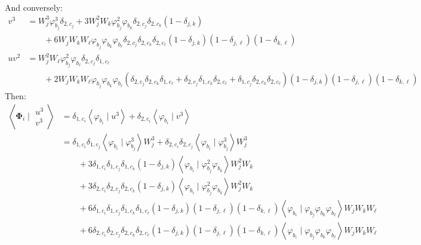 \documentclass{article}
\newcommand{\bvec}[1]{\boldsymbol{#1}}
\begin{document}
\noindent And conversely:
\begin{align*}
    v^3 & = W_j^3 \varphi_{b_j}^3 \delta_{2, c_j}
            + 3 W_j^2 W_k \varphi_{b_j}^2 \varphi_{b_k} \delta_{2, c_j} \delta_{2, c_k} (1 - \delta_{j, k}) \\
            & \qquad + 6 W_j W_k W_\ell \varphi_{b_j} \varphi_{b_k} \varphi_{b_\ell}
                \delta_{2, c_j} \delta_{2, c_k} \delta_{2, c_\ell}
                (1 - \delta_{j, k}) (1 - \delta_{j, \ell}) (1 - \delta_{k, \ell}) \\
    u v^2 & = W_j^2 W_\ell \varphi_{b_j}^2 \varphi_{b_\ell} \delta_{2, c_j} \delta_{1, c_\ell} \\
            & \qquad + 2 W_j W_k W_\ell \varphi_{b_j} \varphi_{b_k} \varphi_{b_\ell}
                (\delta_{2, c_j} \delta_{2, c_k} \delta_{1, c_\ell}
                    + \delta_{2, c_j} \delta_{1, c_k} \delta_{2, c_\ell}
                    + \delta_{1, c_j} \delta_{2, c_k} \delta_{2, c_\ell})
                (1 - \delta_{j, k}) (1 - \delta_{j, \ell}) (1 - \delta_{k, \ell})
\end{align*}
\noindent Then:
\begin{align*}
    \left< \bvec{\Phi}_i \mid \begin{matrix}
        u^3 \\
        v^3
    \end{matrix} \right>
    & = \delta_{1, c_i} \left< \varphi_{b_i} \mid u^3 \right>
        + \delta_{2, c_i} \left< \varphi_{b_i} \mid v^3 \right> \\
    & = \delta_{1, c_i} \delta_{1, c_j} \left< \varphi_{b_i} \mid \varphi_{b_j}^3 \right> W_j^3
        + \delta_{2, c_i} \delta_{2, c_j} \left< \varphi_{b_i} \mid \varphi_{b_j}^3 \right> W_j^3 \\
        & \qquad + 3 \delta_{1, c_i} \delta_{1, c_j} \delta_{1, c_k} (1 - \delta_{j, k})
            \left< \varphi_{b_i} \mid \varphi_{b_j}^2 \varphi_{b_k} \right> W_j^2 W_k \\
        & \qquad + 3 \delta_{2, c_i} \delta_{2, c_j} \delta_{2, c_k} (1 - \delta_{j, k})
            \left< \varphi_{b_i} \mid \varphi_{b_j}^2 \varphi_{b_k} \right> W_j^2 W_k \\
        & \qquad + 6 \delta_{1, c_i} \delta_{1, c_j} \delta_{1, c_k} \delta_{1, c_\ell}
            (1 - \delta_{j, k}) (1 - \delta_{j, \ell}) (1 - \delta_{k, \ell})
            \left< \varphi_{b_i} \mid \varphi_{b_j} \varphi_{b_k} \varphi_{b_\ell} \right> W_j W_k W_\ell \\
        & \qquad + 6 \delta_{2, c_i} \delta_{2, c_j} \delta_{2, c_k} \delta_{2, c_\ell}
            (1 - \delta_{j, k}) (1 - \delta_{j, \ell}) (1 - \delta_{k, \ell})
            \left< \varphi_{b_i} \mid \varphi_{b_j} \varphi_{b_k} \varphi_{b_\ell} \right> W_j W_k W_\ell
\end{align*}
\end{document}
